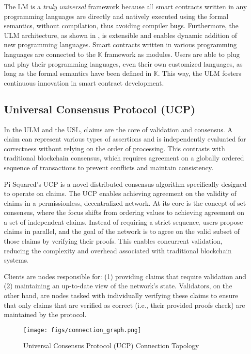 \documentclass{article}
\newcommand{\K}{\ensuremath{\mathbb{K}}\xspace}
\begin{document}
The LM is a \emph{truly universal} framework
because all smart contracts written in any programming languages
are directly and natively executed using the formal semantics, without compilation, thus avoiding compiler bugs.
Furthermore, the ULM architecture, as shown in , is extensible and enables dynamic addition of new programming languages.
Smart contracts written in various programming languages are connected to the \K framework
as modules.
Users are able to plug and play their programming languages, even their own customized languages,
as long as the formal semantics have been defined in \K.
This way, the ULM fosters continuous innovation in smart contract development.





\subsection{Universal Consensus Protocol (UCP)}

In the ULM and the USL, claims are the core of validation and consensus.
A claim can represent various types of assertions and is independently evaluated for correctness without relying on the order of processing.
This contrasts with traditional blockchain consensus, which requires agreement on a globally ordered sequence of transactions to prevent conflicts and maintain consistency.

Pi Squared's UCP is a novel distributed consensus algorithm specifically designed to operate on claims.
The UCP enables achieving agreement on the validity of claims in a permissionless, decentralized network.
At its core is the concept of set consensus, where the focus shifts from ordering values to achieving agreement on a set of independent claims.
Instead of requiring a strict sequence, users propose claims in parallel,
and the goal of the network is to agree on the valid subset of those claims by verifying their proofs.
This enables concurrent validation, reducing the complexity and overhead associated with traditional blockchain systems.

Clients are nodes responsible for: (1) providing claims that require validation and (2) maintaining an up-to-date view of the network’s state. Validators, on the other hand, are nodes tasked with individually verifying these claims to ensure that only claims that are verified as correct (i.e., their provided proofs check) are maintained by the protocol.

\begin{figure}
\centering
\texttt{[image: figs/connection\_graph.png]}
\caption{Universal Consensus Protocol (UCP) Connection Topology}
\label{fig:uc}
\end{figure}
\end{document}
